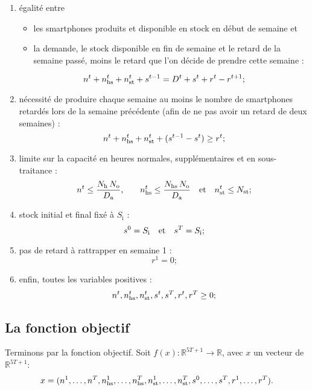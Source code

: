 \begin{enumerate}
    \item égalité entre
    \begin{itemize}
        \item les smartphones produits et disponible en stock en début de semaine et
        \item la demande, le stock disponible en fin de semaine et le retard de la semaine passé, moins le retard que l'on décide de prendre cette semaine :
    \end{itemize}
    \[
        n^t + n_\mathrm{hs}^t + n_\mathrm{st}^t + s^{t-1} = D^t + s^t + r^t - r^{t+1}
        \text;
    \]
    
    \item nécessité de produire chaque semaine au moins le nombre de smartphones retardés lors de la semaine précédente (afin de ne pas avoir un retard de deux semaines) :
    \[
        n^t + n_\mathrm{hs}^t + n_\mathrm{st}^t + (s^{t-1} - s^t) \geq r^t
        \text;
    \]
    
    \item limite sur la capacité en heures normales, supplémentaires et en sous-traitance :
    \[
        n^t \leq \frac{N_\mathrm{h}\,N_\mathrm{o}}{D_\mathrm{a}}
        \text,\qquad
        n_\mathrm{hs}^t \leq \frac{N_\mathrm{hs}\,N_\mathrm{o}}{D_\mathrm{a}}
        \quad\text{et}\quad
        n_\mathrm{st}^t \leq N_\mathrm{st}
        \text;
    \]
    
    \item stock initial et final fixé à $S_\mathrm{i}$ :
    \[
        s^0 = S_\mathrm{i} \quad\text{et}\quad s^T = S_\mathrm{i}
        \text;
    \]
    
    \item pas de retard à rattrapper en semaine 1 :
    \[
        r^1 = 0
        \text{;}
    \]
    
    \item enfin, toutes les variables positives :
    \[
        n^t, n_\mathrm{hs}^t, n_\mathrm{st}^t, s^t, s^T, r^t, r^T \geq 0
        \text;
    \]
\end{enumerate}

\subsection*{La fonction objectif}

Terminons par la fonction objectif. Soit
$f(x) : \mathbb{R}^{5T+1} \rightarrow \mathbb{R}$,
avec $x$ un vecteur de $\mathbb{R}^{5T+1}$:
\[
    x = (n^1,\dots,n^T,n_\mathrm{hs}^1,\dots,n_\mathrm{hs}^T,n_\mathrm{st}^1,\dots,n_\mathrm{st}^T,s^0,\dots,s^T,r^1,\dots,r^T)
    \text.
\]

